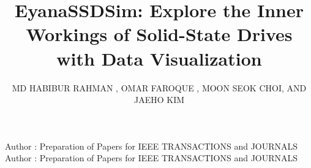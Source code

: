 \documentclass{ieeeaccess}
\begin{document}

\title{EyanaSSDSim: Explore the Inner Workings of Solid-State Drives with Data Visualization}


\author{\uppercase{Md Habibur Rahman} ,
\uppercase{Omar Faroque , MOON SEOK CHOI, and Jaeho Kim}}
\address[1]{Dept. AI Convergence Engineering, Gyeongsang National University, Jinju, South Korea (e-mail: habib@gnu.ac.kr)}
\address[2]{Dept. Computer Science, The University of Texas at Austin, Texas, USA (e-mail: faroque.ae@gmail.com)}
\address[3]{Dept. AI Convergence Engineering, Gyeongsang National University, Jinju, South Korea (e-mail:ch011015@gnu.ac.kr)}
\address[4]{Dept. AI Convergence Engineering, Gyeongsang National University, Jinju, South Korea (e-mail: jaeho.kim@gnu.ac.kr)}

\markboth
{Author \headeretal: Preparation of Papers for IEEE TRANSACTIONS and JOURNALS}
{Author \headeretal: Preparation of Papers for IEEE TRANSACTIONS and JOURNALS}
\end{document}
